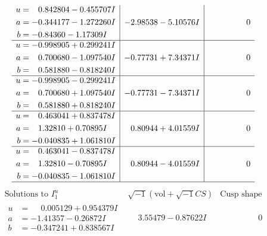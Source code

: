 \documentclass[1p]{elsarticle_modified}
\theoremstyle{definition}
\newcommand{\I}{\sqrt{-1}}
\begin{document}
$$\begin{array}{c|c|c}
\begin{aligned}
u &= \phantom{-}0.842804 - 0.455707 I \\
a &= -0.344177 - 1.272260 I \\
b &= -0.84360 - 1.17309 I\end{aligned}
 & -2.98538 - 5.10576 I & \phantom{-0.000000 } 0 \\ \hline\begin{aligned}
u &= -0.998905 + 0.299241 I \\
a &= \phantom{-}0.700680 - 1.097540 I \\
b &= \phantom{-}0.581880 - 0.818240 I\end{aligned}
 & -0.77731 + 7.34371 I & \phantom{-0.000000 } 0 \\ \hline\begin{aligned}
u &= -0.998905 - 0.299241 I \\
a &= \phantom{-}0.700680 + 1.097540 I \\
b &= \phantom{-}0.581880 + 0.818240 I\end{aligned}
 & -0.77731 - 7.34371 I & \phantom{-0.000000 } 0 \\ \hline\begin{aligned}
u &= \phantom{-}0.463041 + 0.837478 I \\
a &= \phantom{-}1.32810 + 0.70895 I \\
b &= -0.040835 + 1.061810 I\end{aligned}
 & \phantom{-}0.80944 + 4.01559 I & \phantom{-0.000000 } 0 \\ \hline\begin{aligned}
u &= \phantom{-}0.463041 - 0.837478 I \\
a &= \phantom{-}1.32810 - 0.70895 I \\
b &= -0.040835 - 1.061810 I\end{aligned}
 & \phantom{-}0.80944 - 4.01559 I & \phantom{-0.000000 } 0\\
 \hline 
 \end{array}$$\newpage$$\begin{array}{c|c|c}  
\text{Solutions to }I^u_{1}& \I (\text{vol} + \sqrt{-1}CS) & \text{Cusp shape}\\
 \hline 
\begin{aligned}
u &= \phantom{-}0.005129 + 0.954379 I \\
a &= -1.41357 - 0.26872 I \\
b &= -0.347241 + 0.838567 I\end{aligned}
 & \phantom{-}3.55479 - 0.87622 I & \phantom{-0.000000 } 0 \\ \hline\begin{aligned}

\end{aligned}
\end{array}$$
\end{document}

